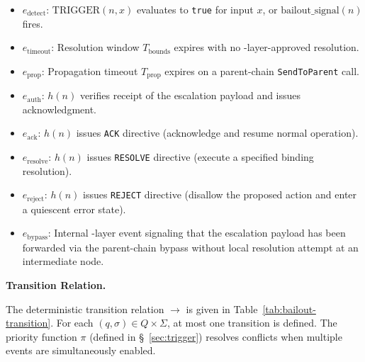 \begin{itemize}\itemsep=0pt
\item $e_{\text{detect}}$: $\text{TRIGGER}(n, x)$ evaluates to \texttt{true} for input $x$, or $\text{bailout\_signal}(n)$ fires.
\item $e_{\text{timeout}}$: Resolution window $T_{\text{bounds}}$ expires with no \fact-layer-approved resolution.
\item $e_{\text{prop}}$: Propagation timeout $T_{\text{prop}}$ expires on a parent-chain \texttt{SendToParent} call.
\item $e_{\text{auth}}$: $h(n)$ verifies receipt of the escalation payload and issues acknowledgment.
\item $e_{\text{ack}}$: $h(n)$ issues \texttt{ACK} directive (acknowledge and resume normal operation).
\item $e_{\text{resolve}}$: $h(n)$ issues \texttt{RESOLVE} directive (execute a specified binding resolution).
\item $e_{\text{reject}}$: $h(n)$ issues \texttt{REJECT} directive (disallow the proposed action and enter a quiescent error state).
\item $e_{\text{bypass}}$: Internal \fact-layer event signaling that the escalation payload has been forwarded via the parent-chain bypass without local resolution attempt at an intermediate node.
\end{itemize}

\medskip
\noindent\textbf{Transition Relation.}

The deterministic transition relation $\rightarrow$ is given in Table~\ref{tab:bailout-transition}. For each $(q, \sigma) \in Q \times \Sigma$, at most one transition is defined. The priority function $\pi$ (defined in \S~\ref{sec:trigger}) resolves conflicts when multiple events are simultaneously enabled.

